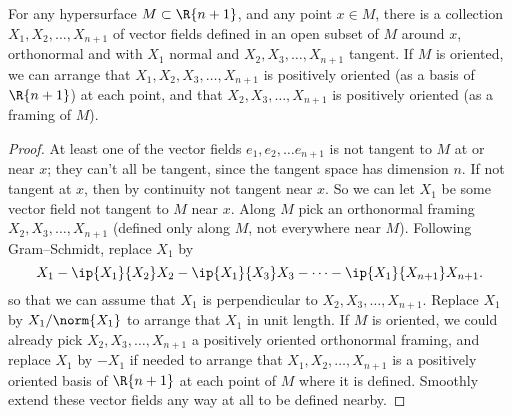 \begin{lemma}
For any hypersurface \(M \subset \R{n+1}\), and any point \(x \in M\), there is a collection \(X_1, X_2, \dots, X_{n+1}\) of vector fields defined in an open subset of \(M\) around \(x\), orthonormal and with \(X_1\) normal and \(X_2, X_3, \dots, X_{n+1}\) tangent.
If \(M\) is oriented, we can arrange that \(X_1, X_2, X_3, \dots, X_{n+1}\) is positively oriented (as a basis of \(\R{n+1}\)) at each point, and that \(X_2, X_3, \dots, X_{n+1}\) is positively oriented (as a framing of \(M\)).
\end{lemma}
\begin{proof}
At least one of the vector fields \(e_1, e_2, \dots e_{n+1}\) is not tangent to \(M\) at or near \(x\); they can't all be tangent, since the tangent space has dimension \(n\).
If not tangent at \(x\), then by continuity not tangent near \(x\).
So we can let \(X_1\) be some vector field not tangent to \(M\) near \(x\).
Along \(M\) pick an orthonormal framing \(X_2, X_3, \dots, X_{n+1}\) (defined only along \(M\), not everywhere near \(M\)).
Following Gram--Schmidt, replace \(X_1\) by
\[
X_1 - \ip{X_1}{X_2} X_2 - \ip{X_1}{X_3} X_3 - \dots - \ip{X_1}{X_{n+1}}X_{n+1}.
\]
so that we can assume that \(X_1\) is perpendicular to \(X_2, X_3, \dots, X_{n+1}\).
Replace \(X_1\) by \(X_1/\norm{X_1}\) to arrange that \(X_1\) in unit length.
If \(M\) is oriented, we could already pick \(X_2, X_3, \dots, X_{n+1}\) a positively oriented orthonormal framing, and replace \(X_1\) by \(-X_1\) if needed to arrange that \(X_1, X_2, \dots, X_{n+1}\) is a positively oriented basis of \(\R{n+1}\) at each point of \(M\) where it is defined.
Smoothly extend these vector fields any way at all to be defined nearby.
\end{proof}

